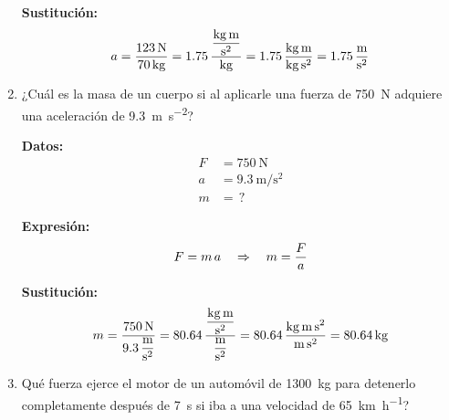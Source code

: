 \documentclass[14pt]{extarticle}
\begin{document}
\begin{enumerate}
\textbf{Sustitución:}
\begin{align*}
a = \dfrac{\SI{123}{\newton}}{\SI{70}{\kilo\gram}} = \num{1.75} \, \dfrac{\displaystyle \si[per-mode=fraction]{\kilo\gram\meter\per\square\second}}{\si{\kilo\gram}} = \num{1.75} \, \dfrac{\displaystyle \si[per-mode=fraction]{\kilo\gram\meter}}{\si{\kilo\gram\square\second}} = \SI[per-mode=fraction]{1.75}{\meter\per\square\second}
\end{align*}

\item ¿Cuál es la masa de un cuerpo si al aplicarle una fuerza de \SI{750}{\newton} adquiere una aceleración de \SI{9.3}{\meter\per\square\second}?

\begin{minipage}[t]{0.3\linewidth}
\textbf{Datos:}
\begin{align*}
F &= \SI{750}{\newton} \\
a &= \SI{9.3}{\meter\per\square\second} \\
m &= \, ?
\end{align*}
\end{minipage}
\hspace{1cm}
\begin{minipage}[t]{0.3\linewidth}
\textbf{Expresión:}
\begin{align*}
F = m \, a \hspace{0.35cm} \Rightarrow \hspace{0.35cm} m = \dfrac{F}{a}
\end{align*}
\end{minipage}

\textbf{Sustitución:}
\begin{align*}
m = \dfrac{\SI{750}{\newton}}{\displaystyle \SI[per-mode=fraction]{9.3}{\meter\per\square\second}} = \num{80.64} \, \dfrac{\displaystyle \si[per-mode=fraction]{\kilo\gram\meter\per\square\second}}{\displaystyle \si[per-mode=fraction]{\meter\per\square\second}} = \num{80.64} \, \dfrac{\displaystyle \si[per-mode=fraction]{\kilo\gram\meter\square\second}}{\si{\meter\square\second}} = \SI{80.64}{\kilo\gram}
\end{align*}
\item Qué fuerza ejerce el motor de un automóvil de \SI{1300}{\kilo\gram} para detenerlo completamente después de \SI{7}{\second} si iba a una velocidad de \SI{65}{\kilo\meter\per\hour}?
\end{enumerate}
\end{document}
